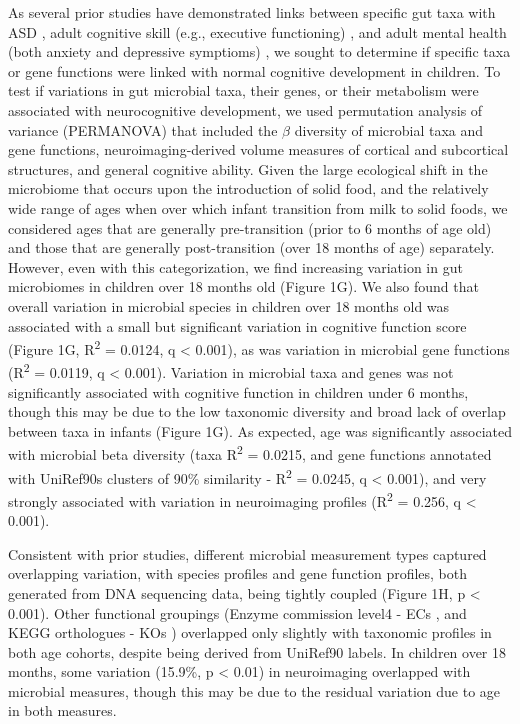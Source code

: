 \documentclass{article}
\begin{document}
As several prior studies have demonstrated links between specific gut taxa
with ASD \cite{liuAlteredGutMicrobiota2019,wanUnderdevelopmentGutMicrobiota2021},
adult cognitive skill (e.g., executive functioning)
\cite{magnussonRelationshipsDietrelatedChanges2015},
and adult mental health (both anxiety and depressive symptioms)
\cite{mayneris-perxachsMicrobiotaAlterationsProline2022,needhamGutderivedMetaboliteAlters2022},
we sought to determine if specific taxa or gene functions were linked
with normal cognitive development in children.
To test if variations in gut microbial taxa,
their genes, or their metabolism were associated with neurocognitive
development, we used permutation analysis of variance (PERMANOVA) 
that included the $\beta$ diversity of microbial taxa and gene functions,
neuroimaging-derived volume measures of cortical and subcortical structures,
and general cognitive ability.
Given the large ecological shift in the microbiome that occurs upon the introduction of solid food,
and the relatively wide range of ages when over which infant transition from milk to solid foods,
we considered ages that are generally pre-transition (prior to 6 months of age old)
and those that are generally post-transition (over 18 months of age) separately.
However, even with this categorization, we find increasing variation
in gut microbiomes in children over 18 months old (Figure 1G).
We also found that overall variation in microbial species in children over 18 months old
was associated with a small but significant variation in cognitive function score
(Figure 1G, R\textsuperscript{2} = 0.0124, q \textless{} 0.001),
as was variation in microbial gene functions (R\textsuperscript{2} = 0.0119, q \textless{} 0.001).
Variation in microbial taxa and genes was not significantly associated with cognitive
function in children under 6 months, though this may be due to the low
taxonomic diversity and broad lack of overlap between taxa in infants (Figure 1G).
As expected, age was significantly associated with microbial beta
diversity (taxa R\textsuperscript{2} = 0.0215, and  gene functions
annotated with UniRef90s clusters of 90\% similarity
\cite{suzekUniRefComprehensiveNonredundant2007} -
R\textsuperscript{2} = 0.0245, q \textless{} 0.001), and very strongly
associated with variation in neuroimaging profiles (R\textsuperscript{2} = 0.256, q
\textless{} 0.001).

Consistent with prior studies, different microbial measurement types
captured overlapping variation, with species profiles and gene function
profiles, both generated from DNA sequencing data, being tightly coupled
(Figure 1H, p \textless{} 0.001). Other functional
groupings (Enzyme commission level4 - ECs
\cite{bairochENZYMEDatabase20002000},
and KEGG orthologues - KOs
\cite{kanehisaKEGGResourceDeciphering2004})
overlapped only slightly with taxonomic profiles in both age
cohorts, despite being derived from UniRef90 labels. In children over 18
months, some variation (15.9\%, p \textless{} 0.01) in neuroimaging
overlapped with microbial measures, though this may be due to the
residual variation due to age in both measures.
\end{document}
